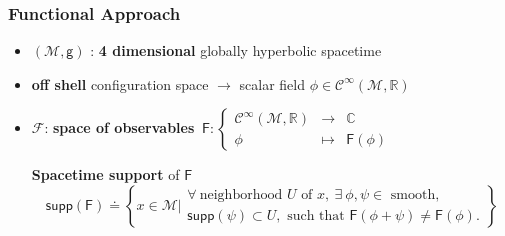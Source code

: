 \documentclass[9pt]{beamer}
\newcommand{\supp}{\mathsf{supp}} %
\newcommand{\Ccal}{\mathcal{C}}
\newcommand{\Fcal}{\mathcal{F}}
\newcommand{\Mcal}{\mathcal{M}}
\newcommand{\Cbb}{\mathbb{C}}
\newcommand{\Rbb}{\mathbb{R}}
\newcommand{\Fsf}{\mathsf{F}}
\newcommand{\gsf}{\mathsf{g}}
\begin{document}
\begin{frame}

  \frametitle{Functional Approach}
  
  \begin{itemize}
  
    \item $(\Mcal,\gsf)$ : \textbf{4 dimensional} globally hyperbolic spacetime 
    
    \item \textbf{off shell} configuration space $\to$ scalar field $\phi \in \Ccal^\infty(\Mcal,\Rbb)$
        
    \item $\Fcal$: \textbf{space of observables}
    $\ \Fsf : \left\{
     \begin{array}{ccc}
       \Ccal^\infty(\Mcal,\Rbb) & \to & \Cbb \\
       \phi & \mapsto & \Fsf(\phi)
     \end{array}
     \right.
    $
   
   \vspace*{10pt}
   
   \textbf{Spacetime support} of $\Fsf$
    \begin{equation*}
      \supp(\Fsf) \doteq \left\{ x \in \Mcal \bigg| 
      \begin{array}{l} 
	\forall \ \mbox{neighborhood } U \mbox{ of } x, \ \exists \ \phi, \psi \in \mbox{ smooth}, \\
	\supp(\psi) \subset U, \mbox{ such that } \Fsf(\phi + \psi) \neq \Fsf(\phi).
      \end{array}
      \right\}
   \end{equation*}
   
 

 
   

  \end{itemize}
 
  
\end{frame}
\end{document}
